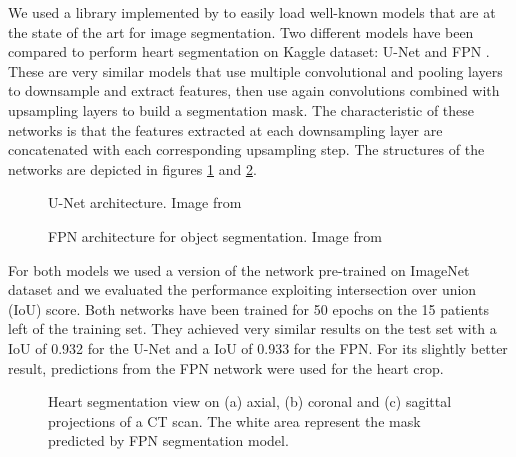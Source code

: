 We used a library implemented by \citeauthor{Iakubovskii:2019} \cite{Iakubovskii:2019} to easily load well-known models that are at the state of the art for image segmentation.
Two different models have been compared to perform heart segmentation on Kaggle dataset: U-Net \cite{ronneberger2015u} and FPN \cite{lin2017feature}.
These are very similar models that use multiple convolutional and pooling layers to downsample and extract features, then use again convolutions combined with upsampling layers to build a segmentation mask.
The characteristic of these networks is that the features extracted at each downsampling layer are concatenated with each corresponding upsampling step.
The structures of the networks are depicted in figures \ref{fig:unet} and \ref{fig:fpn}.

\begin{figure}
    \centering
    \caption{U-Net architecture. Image from \cite{ronneberger2015u}}
    \label{fig:unet}
\end{figure}
\begin{figure}
    \centering
    \caption{FPN architecture for object segmentation. Image from \cite{lin2017feature}}
    \label{fig:fpn}
\end{figure}

For both models we used a version of the network pre-trained on ImageNet dataset \cite{imagenet_cvpr09} and we evaluated the performance exploiting intersection over union (IoU) score.
Both networks have been trained for 50 epochs on the 15 patients left of the training set.
They achieved very similar results on the test set with a IoU of 0.932 for the U-Net and a IoU of 0.933 for the FPN.
For its slightly better result, predictions from the FPN network were used for the heart crop.

\begin{figure}
    \centering
    \begin{subfigure}[c]{0.3\textwidth}
        \caption{}
        \label{subfig:heart_segmentation_axial}
    \end{subfigure}\hspace{1em}
    \begin{subfigure}[c]{0.3\textwidth}
        \caption{}
        \label{subfig:heart_segmentation_coronal}
    \end{subfigure}\hspace{1em}
    \begin{subfigure}[c]{0.3\textwidth}
        \caption{}
        \label{subfig:heart_segmentation_sagittal}
    \end{subfigure}
    
    \caption{Heart segmentation view on (a) axial, (b) coronal and (c) sagittal projections of a CT scan.
             The white area represent the mask predicted by FPN segmentation model.}
    \label{fig:heart_segmentation}
\end{figure}

